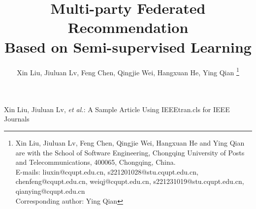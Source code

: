 \documentclass[10pt,journal,compsoc]{IEEEtran}
\begin{document}
\title{Multi-party Federated Recommendation \\ Based on Semi-supervised Learning}
\author
	{
	Xin Liu, Jiuluan Lv, Feng Chen, Qingjie Wei, Hangxuan He, Ying Qian
	\thanks{
		Xin Liu, Jiuluan Lv, Feng Chen, Qingjie Wei, Hangxuan He and Ying Qian are with the School of Software Engineering, Chongqing University of Posts and Telecommunications, 400065, Chongqing, China. \\
		E-mails: liuxin@cqupt.edu.cn, s221201028@stu.cqupt.edu.cn, chenfeng@cqupt.edu.cn, weiqj@cqupt.edu.cn, s221231019@stu.cqupt.edu.cn, qianying@cqupt.edu.cn \\
		Corresponding author: Ying Qian
		}
	}
%
{Xin Liu, Jiuluan Lv, \MakeLowercase{\textit{et al.}}: A Sample Article Using IEEEtran.cls for IEEE Journals}

\end{document}

